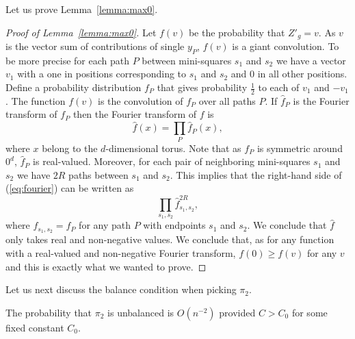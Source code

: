 \documentclass{theoretics}
\begin{document}
Let us prove Lemma~\ref{lemma:max0}.
\begin{proof}[Proof of Lemma~\ref{lemma:max0}]
Let $f(v)$ be the probability that $Z'_g=v$.
As $v$ is the vector sum of contributions of single
$y_P$,  $f(v)$ is a giant
convolution.  To be more precise for each path $P$ between
mini-squares $s_1$ and $s_2$ we have a vector $v_1$ with
a one in positions corresponding to $s_1$ and $s_2$ and
0 in all other positions.  Define a probability distribution
$f_P$ that gives probability $\frac 12$ to each of
$v_1$ and $-v_1$.  The function $f(v)$ is
the convolution of $f_P$ over all paths $P$.
If $\hat f_P$ is the Fourier transform of $f_P$ then
the Fourier transform of $f$ is 
\begin{equation}\label{eq:fourier}
\hat f(x)= \prod_P \hat f_P(x),
\end{equation}
where $x$ belong to the $d$-dimensional torus.
Note that as $f_P$ is symmetric around $0^d$, $\hat f_P$ is
real-valued.  Moreover,  for each pair of neighboring
mini-squares $s_1$ and $s_2$ we have $2R$ paths between
$s_1$ and $s_2$.  This implies that the right-hand side
of (\ref{eq:fourier}) can be written as
$$
\prod_{s_1,s_2} \hat f_{s_1,s_2}^{2R},
$$
where $f_{s_1,s_2}=f_P$ for any path $P$ with endpoints
$s_1$ and $s_2$.   We conclude that $\hat f$ only
takes real and non-negative values.  We conclude that,
as for any function with a real-valued and non-negative Fourier transform,
$f(0)\geq f(v)$ for any $v$ and this is exactly what we wanted to 
prove.
\end{proof}

Let us next discuss the balance condition when
picking $\pi_2$.

\begin{lemma}\label{lemma:unbalance}
The probability that $\pi_2$ is unbalanced
is $O(n^{-2})$ provided $C> C_0$ for some
fixed constant $C_0$.
\end{lemma}
\end{document}
